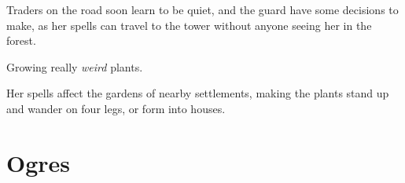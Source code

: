 \begin{multicols}{2}
\begin{dlist}
  Traders on the road soon learn to be quiet, and the \gls{guard} have some decisions to make, as her spells can travel to the tower without anyone seeing her in the forest.
  \item
  Growing really \emph{weird} plants.

  Her spells affect the gardens of nearby settlements, making the plants stand up and wander on four legs, or form into houses.
\end{dlist}

\end{multicols}

\needspace{19em}
\section[Ogre]{Ogres}
\label{ogre}

